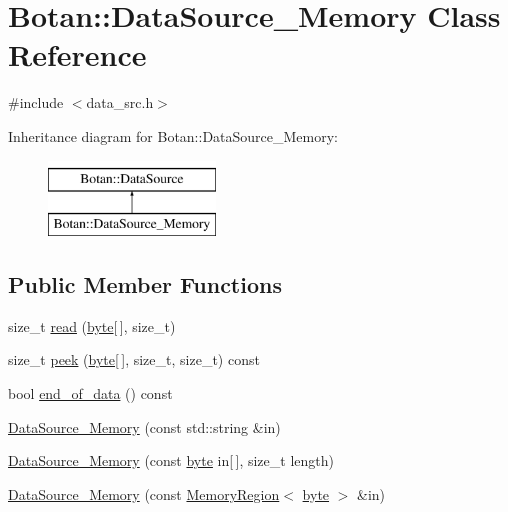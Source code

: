 \hypertarget{classBotan_1_1DataSource__Memory}{\section{Botan\-:\-:Data\-Source\-\_\-\-Memory Class Reference}
\label{classBotan_1_1DataSource__Memory}
}


{\ttfamily \#include $<$data\-\_\-src.\-h$>$}

Inheritance diagram for Botan\-:\-:Data\-Source\-\_\-\-Memory\-:\begin{figure}[H]
\begin{center}
\leavevmode
\includegraphics[height=2.000000cm]{classBotan_1_1DataSource__Memory}
\end{center}
\end{figure}
\subsection*{Public Member Functions}
\begin{DoxyCompactItemize}
\item 
size\-\_\-t \hyperlink{classBotan_1_1DataSource__Memory_a1888934d09225b391248179738cb9a96}{read} (\hyperlink{namespaceBotan_a7d793989d801281df48c6b19616b8b84}{byte}\mbox{[}$\,$\mbox{]}, size\-\_\-t)
\item 
size\-\_\-t \hyperlink{classBotan_1_1DataSource__Memory_a959aa8bcb054947998144deb1ce91031}{peek} (\hyperlink{namespaceBotan_a7d793989d801281df48c6b19616b8b84}{byte}\mbox{[}$\,$\mbox{]}, size\-\_\-t, size\-\_\-t) const 
\item 
bool \hyperlink{classBotan_1_1DataSource__Memory_a6a533903fcc96e021b00c0b135a19ef6}{end\-\_\-of\-\_\-data} () const 
\item 
\hyperlink{classBotan_1_1DataSource__Memory_ab067747052664778ca61888b51a5079b}{Data\-Source\-\_\-\-Memory} (const std\-::string \&in)
\item 
\hyperlink{classBotan_1_1DataSource__Memory_afefaf71593f002bae4b40b93b1ae64ae}{Data\-Source\-\_\-\-Memory} (const \hyperlink{namespaceBotan_a7d793989d801281df48c6b19616b8b84}{byte} in\mbox{[}$\,$\mbox{]}, size\-\_\-t length)
\item 
\hyperlink{classBotan_1_1DataSource__Memory_a3ab494246287f5425997469136694050}{Data\-Source\-\_\-\-Memory} (const \hyperlink{classBotan_1_1MemoryRegion}{Memory\-Region}$<$ \hyperlink{namespaceBotan_a7d793989d801281df48c6b19616b8b84}{byte} $>$ \&in)
\end{DoxyCompactItemize}


